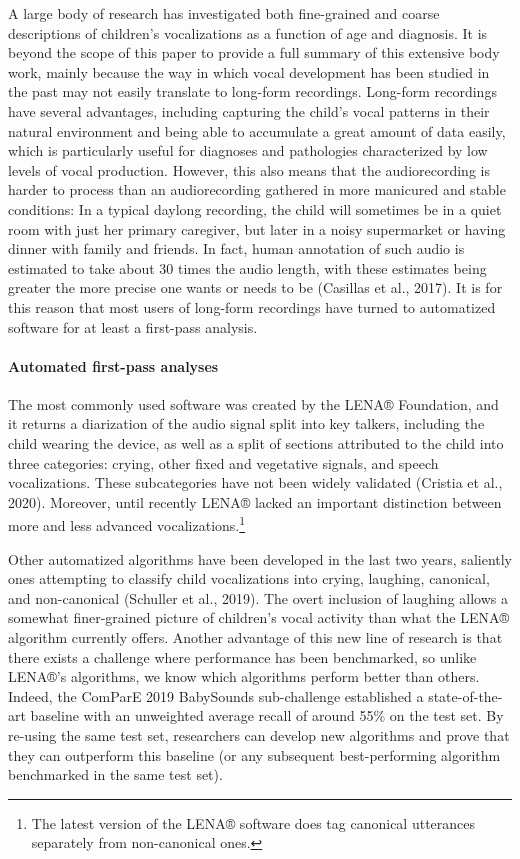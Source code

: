 \documentclass[english,,man]{apa6}
\begin{document}
A large body of research has investigated both fine-grained and coarse descriptions of children's vocalizations as a function of age and diagnosis. It is beyond the scope of this paper to provide a full summary of this extensive body work, mainly because the way in which vocal development has been studied in the past may not easily translate to long-form recordings. Long-form recordings have several advantages, including capturing the child's vocal patterns in their natural environment and being able to accumulate a great amount of data easily, which is particularly useful for diagnoses and pathologies characterized by low levels of vocal production. However, this also means that the audiorecording is harder to process than an audiorecording gathered in more manicured and stable conditions: In a typical daylong recording, the child will sometimes be in a quiet room with just her primary caregiver, but later in a noisy supermarket or having dinner with family and friends. In fact, human annotation of such audio is estimated to take about 30 times the audio length, with these estimates being greater the more precise one wants or needs to be (Casillas et al., 2017). It is for this reason that most users of long-form recordings have turned to automatized software for at least a first-pass analysis.

\hypertarget{automated-first-pass-analyses}{%
\paragraph{Automated first-pass analyses}\label{automated-first-pass-analyses}}

The most commonly used software was created by the LENA® Foundation, and it returns a diarization of the audio signal split into key talkers, including the child wearing the device, as well as a split of sections attributed to the child into three categories: crying, other fixed and vegetative signals, and speech vocalizations. These subcategories have not been widely validated (Cristia et al., 2020). Moreover, until recently LENA® lacked an important distinction between more and less advanced vocalizations.\footnote{The latest version of the LENA® software does tag canonical utterances separately from non-canonical ones.}

Other automatized algorithms have been developed in the last two years, saliently ones attempting to classify child vocalizations into crying, laughing, canonical, and non-canonical (Schuller et al., 2019). The overt inclusion of laughing allows a somewhat finer-grained picture of children's vocal activity than what the LENA® algorithm currently offers. Another advantage of this new line of research is that there exists a challenge where performance has been benchmarked, so unlike LENA®'s algorithms, we know which algorithms perform better than others. Indeed, the ComParE 2019 BabySounds sub-challenge established a state-of-the-art baseline with an unweighted average recall of around 55\% on the test set. By re-using the same test set, researchers can develop new algorithms and prove that they can outperform this baseline (or any subsequent best-performing algorithm benchmarked in the same test set).
\end{document}
